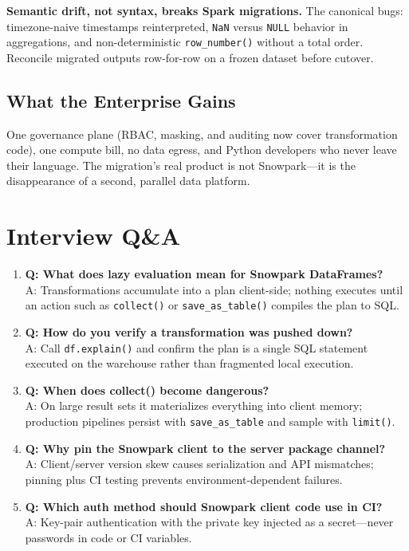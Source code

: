 \begin{pitfall}
\textbf{Semantic drift, not syntax, breaks Spark migrations.} The canonical bugs: timezone-naive timestamps reinterpreted, \texttt{NaN} versus \texttt{NULL} behavior in aggregations, and non-deterministic \texttt{row\_number()} without a total order. Reconcile migrated outputs row-for-row on a frozen dataset before cutover.
\end{pitfall}

\subsection{What the Enterprise Gains}
One governance plane (RBAC, masking, and auditing now cover transformation code), one compute bill, no data egress, and Python developers who never leave their language. The migration's real product is not Snowpark---it is the disappearance of a second, parallel data platform.

\section{Interview Q\&A}
\begin{enumerate}
    \item \textbf{Q: What does lazy evaluation mean for Snowpark DataFrames?}\\
    A: Transformations accumulate into a plan client-side; nothing executes until an action such as \texttt{collect()} or \texttt{save\_as\_table()} compiles the plan to SQL.
    \item \textbf{Q: How do you verify a transformation was pushed down?}\\
    A: Call \texttt{df.explain()} and confirm the plan is a single SQL statement executed on the warehouse rather than fragmented local execution.
    \item \textbf{Q: When does collect() become dangerous?}\\
    A: On large result sets it materializes everything into client memory; production pipelines persist with \texttt{save\_as\_table} and sample with \texttt{limit()}.
    \item \textbf{Q: Why pin the Snowpark client to the server package channel?}\\
    A: Client/server version skew causes serialization and API mismatches; pinning plus CI testing prevents environment-dependent failures.
    \item \textbf{Q: Which auth method should Snowpark client code use in CI?}\\
    A: Key-pair authentication with the private key injected as a secret---never passwords in code or CI variables.
\end{enumerate}

